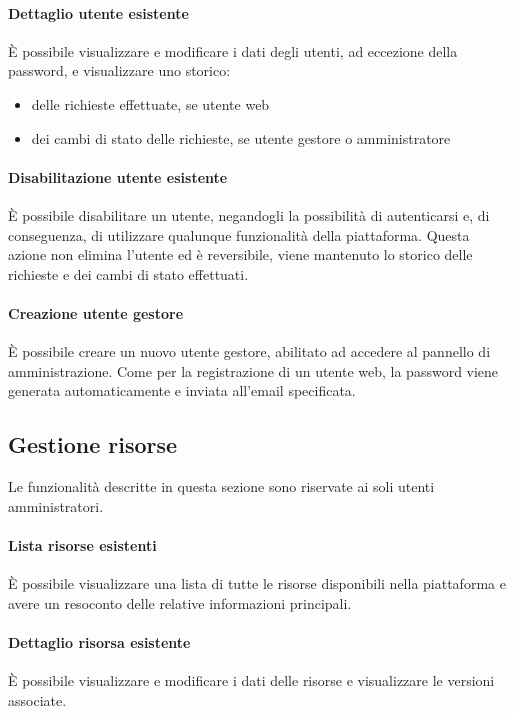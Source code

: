 \paragraph{Dettaglio utente esistente}
È possibile visualizzare e modificare i dati degli utenti, ad eccezione della
password, e visualizzare uno storico:
\begin{itemize}
	\item delle richieste effettuate, se utente web
	\item dei cambi di stato delle richieste, se utente gestore o amministratore
\end{itemize}

\paragraph{Disabilitazione utente esistente}
È possibile disabilitare un utente, negandogli la possibilità di autenticarsi e,
di conseguenza, di utilizzare qualunque funzionalità della piattaforma.
Questa azione non elimina l'utente ed è reversibile, viene mantenuto lo storico
delle richieste e dei cambi di stato effettuati.

\paragraph{Creazione utente gestore}
È possibile creare un nuovo utente gestore, abilitato ad accedere al pannello
di amministrazione. Come per la registrazione di un utente web, la password viene
generata automaticamente e inviata all'email specificata.


\subsection{Gestione risorse}
Le funzionalità descritte in questa sezione sono riservate ai soli utenti
amministratori.

\paragraph{Lista risorse esistenti}
È possibile visualizzare una lista di tutte le risorse disponibili nella
piattaforma e avere un resoconto delle relative informazioni principali.

\paragraph{Dettaglio risorsa esistente}
È possibile visualizzare e modificare i dati delle risorse e visualizzare le
versioni associate.

